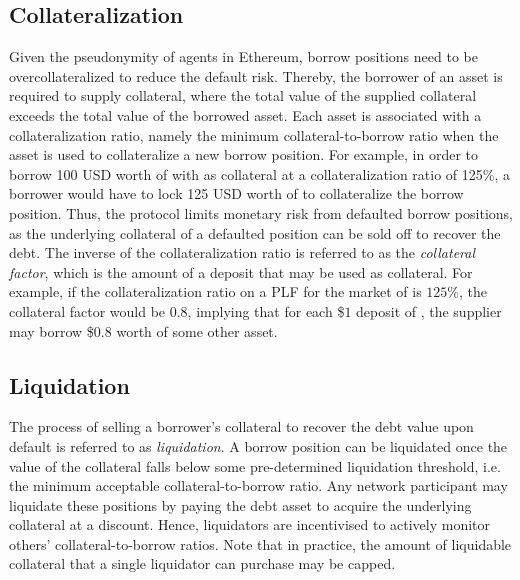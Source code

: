 \subsection{Collateralization}
Given the pseudonymity of agents in Ethereum, borrow positions need to be overcollateralized to reduce the default risk.
Thereby, the borrower of an asset is required to supply collateral, where the total value of the supplied collateral exceeds the total value of the borrowed asset.
Each asset is associated with a collateralization ratio, namely the minimum collateral-to-borrow ratio when the asset is used to collateralize a new borrow position.
For example, in order to borrow 100 USD worth of  with  as collateral at a collateralization ratio of 125\%, a borrower would have to lock 125 USD worth of  to collateralize the borrow position.
Thus, the protocol limits monetary risk from defaulted borrow positions, as the underlying collateral of a defaulted position can be sold off to recover the debt.
The inverse of the collateralization ratio is referred to as the \textit{collateral factor}, which is the amount of a deposit that may be used as collateral.
For example, if the collateralization ratio on a PLF for the market of  is $125$\%, the collateral factor would be $0.8$, implying that for each \$$1$ deposit of , the supplier may borrow \$$0.8$ worth of some other asset.

\subsection{Liquidation}
The process of selling a borrower's collateral to recover the debt value upon default is referred to as \textit{liquidation}.
A borrow position can be liquidated once the value of the collateral falls below some pre-determined liquidation threshold, i.e. the minimum acceptable collateral-to-borrow ratio.
Any network participant may liquidate these positions by paying the debt asset to acquire the underlying collateral at a discount.
Hence, liquidators are incentivised to actively monitor others' collateral-to-borrow ratios. 
Note that in practice, the amount of liquidable collateral that a single liquidator can purchase may be capped.  

